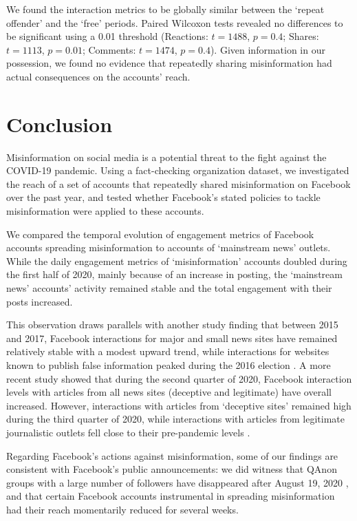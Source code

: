 \documentclass[sigconf]{acmart}
\begin{document}
We found the interaction metrics to be globally similar between the `repeat offender' and the `free' periods. Paired Wilcoxon tests revealed no differences to be significant using a 0.01 threshold (Reactions: $t=1488$, $p=0.4$; Shares: $t=1113$, $p=0.01$; Comments: $t=1474$, $p=0.4$). Given information in our possession, we found no evidence that repeatedly sharing misinformation had actual consequences on the accounts' reach.

\section{Conclusion}

Misinformation on social media is a potential threat to the fight against the COVID-19 pandemic. Using a fact-checking organization dataset, we investigated the reach of a set of accounts that repeatedly shared misinformation on Facebook over the past year, and tested whether Facebook's stated policies to tackle misinformation were applied to these accounts. 

We compared the temporal evolution of engagement metrics of Facebook accounts spreading misinformation to accounts of `mainstream news' outlets. While the daily engagement metrics of `misinformation' accounts doubled during the first half of 2020, mainly because of an increase in posting, the `mainstream news' accounts' activity remained stable and the total engagement with their posts increased. 

This observation draws parallels with another study finding that between 2015 and 2017, Facebook interactions for major and small news sites have remained relatively stable with a modest upward trend, while interactions for websites known to publish false information peaked during the 2016 election \cite{allcott2019trends}. A more recent study showed that during the second quarter of 2020, Facebook interaction levels with articles from all news sites (deceptive and legitimate) have overall increased. However, interactions with articles from `deceptive sites' remained high during the third quarter of 2020, while interactions with articles from legitimate journalistic outlets fell close to their pre-pandemic levels \cite{KornbluhPandemic}. 

Regarding Facebook's actions against misinformation, some of our findings are consistent with Facebook's public announcements: we did witness that QAnon groups with a large number of followers have disappeared after August 19, 2020 \cite{FacebookQAnon}, and that certain Facebook accounts instrumental in spreading misinformation had their reach momentarily reduced for several weeks.
\end{document}
